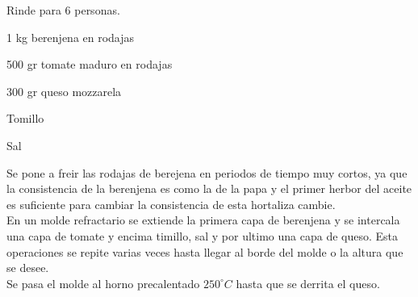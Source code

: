 
Rinde para 6 personas.

\begin{ingredientes}
\item 1 kg berenjena en rodajas
\item 500 gr tomate maduro en rodajas
\item 300 gr queso mozzarela
\item Tomillo
\item Sal
\end{ingredientes}
\preparacion


Se pone a freir las rodajas de berejena en periodos de tiempo muy cortos, ya que la consistencia de la berenjena es como la de la papa y el primer herbor del aceite es suficiente para cambiar la consistencia de esta hortaliza cambie.\\

En un molde refractario se extiende la primera capa de berenjena y se intercala una capa de tomate y encima timillo, sal y por ultimo una capa de queso. Esta operaciones se repite varias veces hasta llegar al borde del molde o la altura que se desee.\\

Se pasa el molde al horno precalentado $250^{\circ}C$ hasta que se derrita el queso.